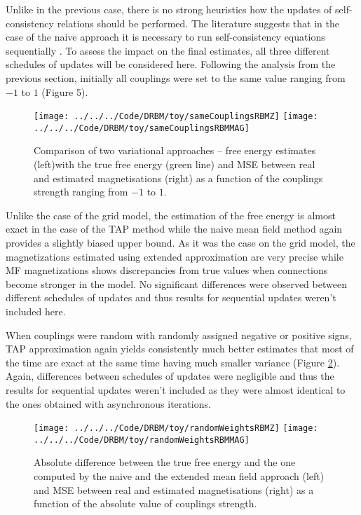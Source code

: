 Unlike in the previous case, there is no strong heuristics how the updates of self-consistency relations should be performed. The literature suggests that in the case of the naive approach it is necessary to run self-consistency equations sequentially \cite{welling2002new}. To assess the impact on the final estimates, all three different schedules of updates will be considered here. Following the analysis from the previous section, initially all couplings were set to the same value ranging from $-1$ to $1$  (Figure 5).
\begin{figure}[!htb]
%
\texttt{[image: ../../../Code/DRBM/toy/sameCouplingsRBMZ]}
\endminipage 
{}  
\texttt{[image: ../../../Code/DRBM/toy/sameCouplingsRBMMAG]}
\endminipage\hfill
\label{fig:rbmSame}
  \caption[1]{Comparison of two  variational approaches -- free energy estimates (left)with the true free energy (green line) and MSE between real and estimated magnetisations (right) as a function of the couplings strength ranging from $-1$ to $1$.}
\end{figure}

Unlike the case of the grid model, the estimation of the free energy is almost exact in the case of the TAP method while the naive mean field method again provides a slightly biased upper bound. As it was the case on the grid model, the magnetizations estimated using extended approximation are very precise while MF magnetizations shows discrepancies from true values when connections become stronger in the model. No significant differences were observed between different schedules of updates and thus results for sequential updates weren't included here.

When couplings were random with randomly assigned negative or positive signs, TAP approximation again yields consistently much better estimates that most of the time are exact at the same time having much smaller variance (Figure \ref{fig:rbmRandom}). Again, differences between schedules of updates were negligible and thus the results for sequential updates weren't included as they were almost identical to the ones obtained with asynchronous iterations.
\begin{figure}[!htb]
%
\texttt{[image: ../../../Code/DRBM/toy/randomWeightsRBMZ]}
\endminipage 
{}  
\texttt{[image: ../../../Code/DRBM/toy/randomWeightsRBMMAG]}
\endminipage\hfill
  \caption[1]{Absolute difference between the true free energy and the one computed by the naive and the extended mean field approach (left) and MSE between real and estimated magnetisations (right) as a function of the absolute value of couplings strength.}
  \label{fig:rbmRandom}
\end{figure}


